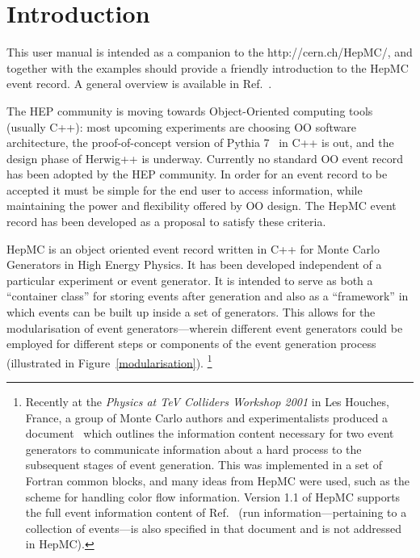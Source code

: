 \documentclass[11pt,letterpaper]{article}
\begin{document}


%
%

\section{Introduction}

This user manual is intended as a companion to the 
{http://cern.ch/HepMC/}, and together with the examples
should provide a friendly introduction to the HepMC event record. A
general overview is available in Ref.~\cite{dobbs:2000CompPhysComm}.

The HEP community is moving towards Object-Oriented computing tools
(usually C++): most upcoming experiments are choosing OO software
architecture, the proof-of-concept version of Pythia
7~\cite{Lonnblad:1999cq} in C++ is out, and the design phase of
Herwig++ is underway.  Currently no standard OO event record has been
adopted by the HEP community.  In order for an event record to be
accepted it must be simple for the end user to access information,
while maintaining the power and flexibility offered by OO design. The
HepMC event record has been developed as a proposal to satisfy these
criteria.

HepMC is an object oriented event record written in C++ for Monte
Carlo Generators in High Energy Physics. It has been developed
independent of a particular experiment or event generator.  It is
intended to serve as both a ``container class'' for storing events after
generation and also as a ``framework'' in which events can be built up
inside a set of generators. This allows for the modularisation of
event generators---wherein different event generators could be
employed for different steps or components of the event generation
process (illustrated in Figure~\ref{modularisation}).
\footnote{
%
Recently at the {\it Physics at TeV Colliders Workshop 2001} in Les
Houches, France, a group of Monte Carlo authors and experimentalists
produced a document~\cite{Boos:2001cv} which outlines the information
content necessary for two event generators to communicate information
about a hard process to the subsequent stages of event
generation. This was implemented in a set of Fortran common blocks,
and many ideas from HepMC were used, such as the scheme for handling
color flow information. Version 1.1 of HepMC supports the full event
information content of Ref.~\cite{Boos:2001cv} (run
information---pertaining to a collection of events---is also specified
in that document and is not addressed in HepMC).  }
\end{document}

